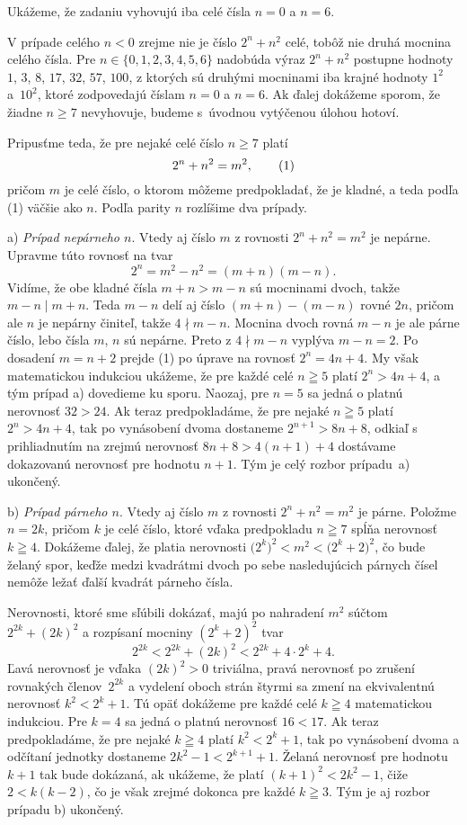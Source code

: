 {%
Ukážeme, že zadaniu vyhovujú iba celé čísla $n=0$ a $n=6$.

V prípade celého $n<0$ zrejme nie je číslo $2^n+n^2$ celé,
tobôž nie druhá mocnina celého čísla.
Pre $n\in\{0,1,2,3,4,5,6\}$ nadobúda výraz $2^n+n^2$
postupne hodnoty $1$, $3$, $8$, $17$, $32$, $57$, $100$, z ktorých
sú druhými mocninami iba krajné hodnoty $1^2$ a~$10^2$,
ktoré zodpovedajú číslam $n=0$ a $n=6$. Ak ďalej dokážeme sporom,
že žiadne $n\ge 7$ nevyhovuje, budeme s~úvodnou vytýčenou úlohou hotoví.

Pripusťme teda, že pre nejaké celé číslo $n\ge 7$ platí
$$
2^n+n^2=m^2,
\tag1
$$
pričom $m$ je celé číslo, o ktorom môžeme predpokladať, že je
kladné, a teda podľa (1) väčšie ako $n$. Podľa parity $n$
rozlíšime dva prípady.

\smallskip
a) \emph{Prípad nepárneho $n$}. Vtedy aj číslo $m$ z rovnosti $2^n+n^2=m^2$
je nepárne. Upravme túto rovnosť na tvar
$$
2^n=m^2-n^2=(m+n)(m-n).
$$
Vidíme, že obe kladné čísla $m+n>m-n$ sú mocninami dvoch,
takže $m-n\mid m+n$. Teda $m-n$ delí aj
číslo $(m+n)-(m-n)$ rovné $2n$, pričom ale $n$ je nepárny činiteľ,
takže $4\nmid m-n$. Mocnina dvoch rovná $m-n$ je ale párne číslo,
lebo čísla $m$, $n$ sú nepárne. Preto z $4\nmid m-n$ vyplýva
$m-n=2$. Po dosadení $m=n+2$ prejde (1) po
úprave na rovnosť $2^n=4n+4$. My však matematickou indukciou
ukážeme, že pre každé celé $n\geqq5$ platí $2^n>4n+4$, a tým
prípad a) dovedieme ku sporu. Naozaj, pre $n=5$ sa jedná o platnú nerovnosť
$32>24$. Ak teraz predpokladáme, že
pre nejaké $n\geqq5$ platí $2^n>4n+4$, tak po vynásobení dvoma
dostaneme $2^{n+1}>8n+8$, odkiaľ s prihliadnutím na zrejmú
nerovnosť $8n+8>4(n+1)+4$ dostávame dokazovanú
nerovnosť pre hodnotu $n+1$. Tým je celý rozbor prípadu~a) ukončený.

\smallskip
b) \emph{Prípad párneho $n$}. Vtedy aj číslo $m$ z rovnosti $2^n+n^2=m^2$
je párne. Položme $n=2k$, pričom $k$ je celé číslo, ktoré vďaka predpokladu
$n\geqq7$ spĺňa nerovnosť $k\geqq4$. Dokážeme ďalej, že platia nerovnosti
$\bigl(2^k\bigr)^2 < m^2 <\bigl(2^k+2\bigr)^2$, čo bude želaný spor,
keďže medzi kvadrátmi dvoch po sebe nasledujúcich párnych čísel nemôže ležať
ďalší kvadrát párneho čísla.

Nerovnosti, ktoré sme sľúbili dokázať, majú po nahradení $m^2$
súčtom $2^{2k}+(2k)^2$ a rozpísaní mocniny $(2^k+2)^2$ tvar
$$
2^{2k}<2^{2k}+(2k)^2<2^{2k}+4\cdot2^{k}+4.
$$
Ľavá nerovnosť je vďaka $(2k)^2>0$ triviálna, pravá nerovnosť po
zrušení rovnakých členov~$2^{2k}$ a vydelení oboch strán štyrmi
sa zmení na ekvivalentnú nerovnosť $k^2<2^k+1$. Tú opäť dokážeme pre
každé celé $k\geqq4$ matematickou indukciou. Pre $k=4$ sa jedná o
platnú nerovnosť $16<17$. Ak teraz predpokladáme, že
pre nejaké $k\geqq4$ platí $k^2<2^k+1$, tak po vynásobení dvoma
a odčítaní jednotky dostaneme $2k^2-1<2^{k+1}+1$. Želaná
nerovnosť pre hodnotu $k+1$ tak bude dokázaná, ak ukážeme, že
platí $(k+1)^2<2k^2-1$, čiže $2<k(k-2)$, čo je však zrejmé
dokonca pre každé $k\geqq3$. Tým je aj rozbor prípadu b) ukončený.

}

